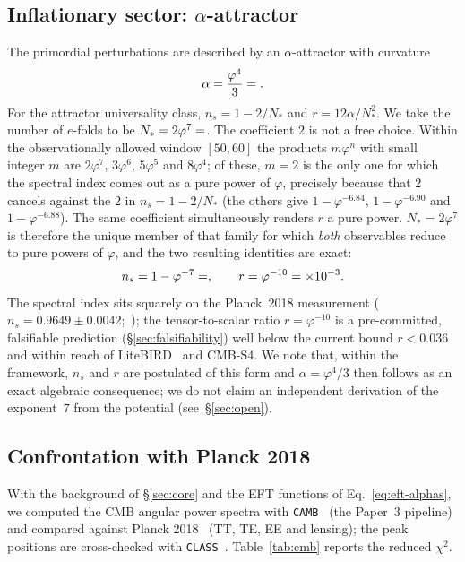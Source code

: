 \documentclass[a4paper,11pt]{article}
\begin{document}
\subsection{Inflationary sector: $\alpha$-attractor}
\label{sec:inflation}
The primordial perturbations are described by an $\alpha$-attractor
\citep{Kallosh2013} with curvature
\begin{equation}
  \label{eq:alpha-attractor}
  \alpha=\frac{\varphi^4}{3}=\val{ALPHA_ATT_d6} .
\end{equation}
For the attractor universality class, $n_s=1-2/N_\ast$ and
$r=12\alpha/N_\ast^2$. We take the number of $e$-folds to be
$N_\ast=2\varphi^7=\val{dos_phi7_d6}$. The coefficient $2$ is not a free choice. Within
the observationally allowed window $[50,60]$ the products $m\varphi^n$ with
small integer $m$ are $2\varphi^7$, $3\varphi^6$, $5\varphi^5$ and $8\varphi^4$;
of these, $m=2$ is the only one for which the spectral index comes out as a pure
power of $\varphi$, precisely because that $2$ cancels against the $2$ in
$n_s=1-2/N_\ast$ (the others give $1-\varphi^{-6.84}$, $1-\varphi^{-6.90}$ and
$1-\varphi^{-6.88}$). The same coefficient simultaneously renders $r$ a pure
power. $N_\ast=2\varphi^7$ is therefore the unique member of that family for
which \emph{both} observables reduce to pure powers of $\varphi$, and the two
resulting identities are exact:
\begin{equation}
  \label{eq:ns-r}
  n_s = 1-\varphi^{-7}=\val{N_S_d6} ,
  \qquad
  r   = \varphi^{-10}=\val{r_tensor_mil_d6}\times10^{-3} .
\end{equation}
The spectral index sits squarely on the Planck~2018 measurement
($n_s=0.9649\pm0.0042$;~\citealp{Planck2018}); the tensor-to-scalar ratio
$r=\varphi^{-10}$ is a
pre-committed, falsifiable prediction (\S\ref{sec:falsifiability}) well below
the current bound $r<0.036$~\citep{BICEPKeck2021} and within reach of
LiteBIRD~\citep{LiteBIRD2023} and CMB-S4. We note
that, within the framework, $n_s$ and $r$ are postulated of this form and
$\alpha=\varphi^4/3$ then follows as an exact algebraic consequence; we do not
claim an independent derivation of the exponent~$7$ from the potential
(see~\S\ref{sec:open}).

\subsection{Confrontation with Planck 2018}
\label{sec:cmb-confront}
With the background of \S\ref{sec:core} and the EFT functions of
Eq.~\eqref{eq:eft-alphas}, we computed the CMB angular power spectra with \texttt{CAMB}~\citep{Lewis2000}
(the Paper~3 pipeline) and compared against Planck
2018~\citep{PlanckLikelihood2020} (TT, TE, EE and lensing); the peak positions
are cross-checked with \texttt{CLASS}~\citep{Lesgourgues2011}.
Table~\ref{tab:cmb} reports the reduced $\chi^2$.
\end{document}
